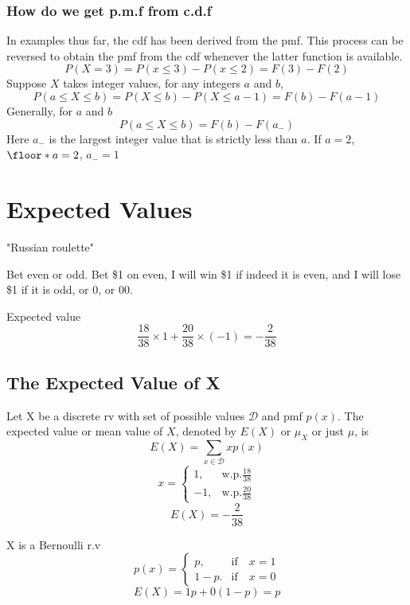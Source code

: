 \subsubsection{How do we get p.m.f from c.d.f}
In examples thus far, the cdf has been derived from the pmf. This process can be reversed to obtain the pmf from the cdf whenever the latter function is available.
\[P(X=3)=P(x\leq 3)-P(x \leq 2)=F(3)-F(2)\]
Suppose $X$ takes integer values, for any integers $a$ and $b$,
\[P(a\leq X \leq b)=P( X \leq b)-P(X \leq a-1)=F(b)-F(a-1)\]
Generally, for $a$ and $b$
\[P(a\leq X \leq b)=F(b)-F(a_-)\]
Here $a_-$ is the largest integer value that is strictly less than $a$. If $a=2$, $\floor*{a}=2$, $a_-=1$  

\section{Expected Values}
\begin{exmp}
"Russian roulette"

Bet even or odd. Bet \$1 on even, I will win \$1 if indeed it is even, and I will lose \$1 if it is odd, or 0, or 00.

Expected value
\[	\frac{18}{38}\times1+\frac{20}{38}\times(-1)=-\frac{2}{38}	\]

\end{exmp}

\subsection{The Expected Value of X}
\begin{defn}
Let X be a discrete rv with set of possible values $\mathcal{D}$ and pmf $p(x)$. The expected value or mean value of $X$, denoted by $E(X)$ or $\mu_X$ or just $\mu$, is
\[E(X)=\sum_{x\in \mathcal{D}} x p(x)\]
\[x=\begin{cases}
1,&\text{w.p.}\frac{18}{38} \\
-1,&\text{w.p.}\frac{20}{38}
\end{cases}\]
\[ E(X)=-\frac{2}{38}\]
\end{defn}

\begin{exmp}
X is a Bernoulli r.v
\[p(x)=\begin{cases}
p, & \text{if} \quad x=1\\
1-p. & \text{if} \quad x=0
\end{cases}\]
\[E(X)=1 p+0 (1-p)=p\]
\end{exmp}

